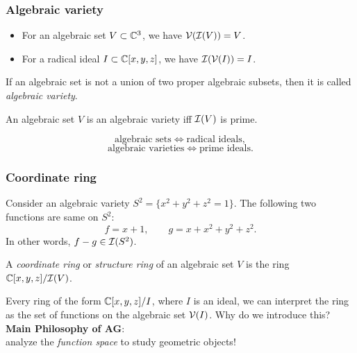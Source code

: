 \documentclass[10pt,handout]{beamer}
\begin{document}
\begin{frame}
\frametitle{Algebraic variety}
  \begin{prop}\begin{itemize}
    \item For an algebraic set $V\subset\mathbb{C}^3$, we have $\mathcal{V}(\mathcal{I}(V))=V$.
    \item For a radical ideal $I\subset\mathbb{C}[x,y,z]$, we have $\mathcal{I}(\mathcal{V}(I))=I$.
  \end{itemize}\end{prop}
  \pause
  \begin{defn}
    If an algebraic set is not a union of two proper algebraic subsets, then it is called \emph{algebraic variety}.
  \end{defn}
  \begin{prop}
    An algebraic set $V$ is an algebraic variety iff $\mathcal{I}(V)$ is prime.
  \end{prop}
  \pause
  \[\text{algebraic sets}\iff\text{radical ideals},\]\vspace{-1em}
  \[\text{algebraic varieties}\iff\text{prime ideals}.\]
\end{frame}

\begin{frame}
\frametitle{Coordinate ring}
  Consider an algebraic variety $S^2=\{x^2+y^2+z^2=1\}$.
  The following two functions are same on $S^2$:
  \[f=x+1,\qquad g=x+x^2+y^2+z^2.\]
  In other words, $f-g\in\mathcal{I}(S^2)$.
  \pause
  \begin{defn}
    A \emph{coordinate ring} or \emph{structure ring} of an algebraic set $V$ is the ring $\mathbb{C}[x,y,z]/\mathcal{I}(V)$.
  \end{defn}
  \bigskip
  Every ring of the form $\mathbb{C}[x,y,z]/I$, where $I$ is an ideal, we can interpret the ring as the set of functions on the algebraic set $\mathcal{V}(I)$.
  Why do we introduce this?\\
  \smallskip
  \pause \textbf{Main Philosophy of AG}:\\
  \qquad\qquad analyze the \emph{function space} to study geometric objects!
\end{frame}
\end{document}
